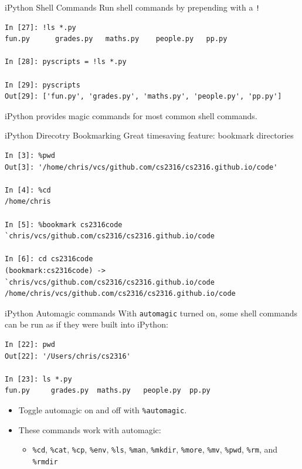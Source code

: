\documentclass[smaller, aspectratio=1610]{beamer}
\begin{document}
\begin{frame}[label={sec:org8d38d0b},fragile]{iPython Shell Commands}
 Run shell commands by prepending with a \texttt{!}

\lstset{language=sh,label= ,caption= ,captionpos=b,numbers=none}
\begin{lstlisting}
In [27]: !ls *.py
fun.py		grades.py	maths.py	people.py	pp.py

In [28]: pyscripts = !ls *.py

In [29]: pyscripts
Out[29]: ['fun.py', 'grades.py', 'maths.py', 'people.py', 'pp.py']
\end{lstlisting}

iPython provides magic commands for most common shell commands.
\end{frame}


\begin{frame}[label={sec:orgc0660a5},fragile]{iPython Direcotry Bookmarking}
 Great timesaving feature: bookmark directories

\lstset{language=sh,label= ,caption= ,captionpos=b,numbers=none}
\begin{lstlisting}
In [3]: %pwd
Out[3]: '/home/chris/vcs/github.com/cs2316/cs2316.github.io/code'

In [4]: %cd
/home/chris

In [5]: %bookmark cs2316code `chris/vcs/github.com/cs2316/cs2316.github.io/code

In [6]: cd cs2316code
(bookmark:cs2316code) -> `chris/vcs/github.com/cs2316/cs2316.github.io/code
/home/chris/vcs/github.com/cs2316/cs2316.github.io/code
\end{lstlisting}
\end{frame}

\begin{frame}[label={sec:org5300b41},fragile]{iPython Automagic commands}
 With \texttt{automagic} turned on, some shell commands can be run as if they were built into iPython:

\lstset{language=sh,label= ,caption= ,captionpos=b,numbers=none}
\begin{lstlisting}
In [22]: pwd
Out[22]: '/Users/chris/cs2316'

In [23]: ls *.py
fun.py     grades.py  maths.py   people.py  pp.py
\end{lstlisting}

\begin{itemize}
\item Toggle automagic on and off with \texttt{\%automagic}.

\item These commands work with automagic:

\begin{itemize}
\item \texttt{\%cd}, \texttt{\%cat}, \texttt{\%cp}, \texttt{\%env}, \texttt{\%ls}, \texttt{\%man}, \texttt{\%mkdir}, \texttt{\%more}, \texttt{\%mv}, \texttt{\%pwd}, \texttt{\%rm},  and \texttt{\%rmdir}
\end{itemize}
\end{itemize}
\end{frame}
\end{document}
